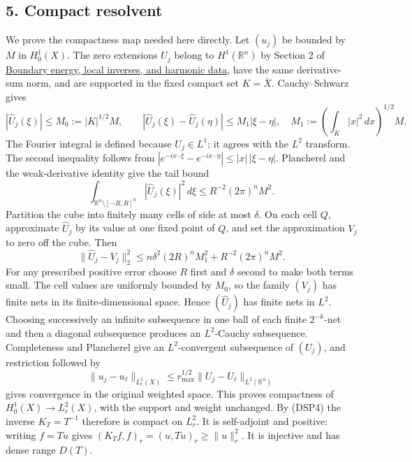 \documentclass[
  11pt,
]{article}
\begin{document}
\subsection{5. Compact resolvent}\label{compact-resolvent}

We prove the compactness map needed here directly. Let \((u_j)\) be
bounded by \(M\) in \(H_0^1(X)\). The zero extensions \(U_j\) belong to
\(H^1(\mathbb R^n)\) by Section 2 of
\href{second-order-boundary.pdf}{Boundary energy, local inverses, and
harmonic data}, have the same derivative-sum norm, and are supported in
the fixed compact set \(K=\overline X\). Cauchy--Schwarz gives \[
 |\widehat U_j(\xi)|\leq M_0:=|K|^{1/2}M,\qquad
 |\widehat U_j(\xi)-\widehat U_j(\eta)|
 \leq M_1|\xi-\eta|,\quad
 M_1:=\left(\int_K|x|^2\,dx\right)^{1/2}M.
\] The Fourier integral is defined because \(U_j\in L^1\); it agrees
with the \(L^2\) transform. The second inequality follows from
\(|e^{-ix\cdot\xi}-e^{-ix\cdot\eta}|\leq|x|\,|\xi-\eta|\). Plancherel
and the weak-derivative identity give the tail bound \[
 \int_{\mathbb R^n\setminus[-R,R]^n}|\widehat U_j(\xi)|^2\,d\xi
 \leq R^{-2}(2\pi)^nM^2.
\] Partition the cube into finitely many cells of side at most
\(\delta\). On each cell \(Q\), approximate \(\widehat U_j\) by its
value at one fixed point of \(Q\), and set the approximation \(V_j\) to
zero off the cube. Then \[
 \|\widehat U_j-V_j\|_2^2
 \leq n\delta^2(2R)^nM_1^2+R^{-2}(2\pi)^nM^2.
\] For any prescribed positive error choose \(R\) first and \(\delta\)
second to make both terms small. The cell values are uniformly bounded
by \(M_0\), so the family \((V_j)\) has finite nets in its
finite-dimensional space. Hence \((\widehat U_j)\) has finite nets in
\(L^2\). Choosing successively an infinite subsequence in one ball of
each finite \(2^{-k}\)-net and then a diagonal subsequence produces an
\(L^2\)-Cauchy subsequence. Completeness and Plancherel give an
\(L^2\)-convergent subsequence of \((U_j)\), and restriction followed by
\[
 \|u_j-u_\ell\|_{L^2_r(X)}
 \leq r_{\max}^{1/2}\|U_j-U_\ell\|_{L^2(\mathbb R^n)}
\] gives convergence in the original weighted space. This proves
compactness of \(H_0^1(X)\to L^2_r(X)\), with the support and weight
unchanged. By (DSP4) the inverse \(K_T=T^{-1}\) therefore is compact on
\(L^2_r\). It is self-adjoint and positive: writing \(f=Tu\) gives
\((K_Tf,f)_r=(u,Tu)_r\geq\|u\|_r^2\). It is injective and has dense
range \(D(T)\).
\end{document}
